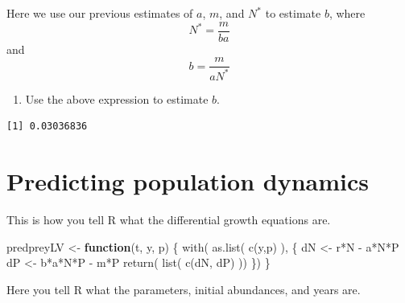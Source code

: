 \documentclass[
  letterpaper,
  DIV=11,
  numbers=noendperiod]{scrreprt}
\newenvironment{Shaded}{\begin{snugshade}}{\end{snugshade}}
\newcommand{\ControlFlowTok}[1]{\textcolor[rgb]{0.00,0.23,0.31}{\textbf{#1}}}
\newcommand{\FunctionTok}[1]{\textcolor[rgb]{0.28,0.35,0.67}{#1}}
\newcommand{\NormalTok}[1]{\textcolor[rgb]{0.00,0.23,0.31}{#1}}
\newcommand{\OtherTok}[1]{\textcolor[rgb]{0.00,0.23,0.31}{#1}}
\newcommand{\SpecialCharTok}[1]{\textcolor[rgb]{0.37,0.37,0.37}{#1}}
\providecommand{\tightlist}{%
  \setlength{\itemsep}{0pt}\setlength{\parskip}{0pt}}
\begin{document}
Here we use our previous estimates of \(a\), \(m\), and \(N^*\) to
estimate \(b\), where \[N^* = \frac{m}{ba}\] and \[b=\frac{m}{aN^*}\]

\begin{enumerate}
\def\labelenumi{\arabic{enumi}.}
\setcounter{enumi}{8}
\tightlist
\item
  Use the above expression to estimate \(b\).
\end{enumerate}

\begin{Shaded}
\end{Shaded}

\begin{verbatim}
[1] 0.03036836
\end{verbatim}

\section{Predicting population
dynamics}\label{predicting-population-dynamics}

This is how you tell R what the differential growth equations are.

\begin{Shaded}
\begin{Highlighting}[]
\NormalTok{predpreyLV }\OtherTok{\textless{}{-}} \ControlFlowTok{function}\NormalTok{(t, y, p) \{}
    \FunctionTok{with}\NormalTok{( }\FunctionTok{as.list}\NormalTok{( }\FunctionTok{c}\NormalTok{(y,p) ), \{}
\NormalTok{      dN }\OtherTok{\textless{}{-}}\NormalTok{ r}\SpecialCharTok{*}\NormalTok{N }\SpecialCharTok{{-}}\NormalTok{ a}\SpecialCharTok{*}\NormalTok{N}\SpecialCharTok{*}\NormalTok{P}
\NormalTok{      dP }\OtherTok{\textless{}{-}}\NormalTok{ b}\SpecialCharTok{*}\NormalTok{a}\SpecialCharTok{*}\NormalTok{N}\SpecialCharTok{*}\NormalTok{P }\SpecialCharTok{{-}}\NormalTok{ m}\SpecialCharTok{*}\NormalTok{P}
      \FunctionTok{return}\NormalTok{( }\FunctionTok{list}\NormalTok{( }\FunctionTok{c}\NormalTok{(dN, dP) ))}
\NormalTok{    \})}
\NormalTok{\}}
\end{Highlighting}
\end{Shaded}

Here you tell R what the parameters, initial abundances, and years are.
\end{document}
